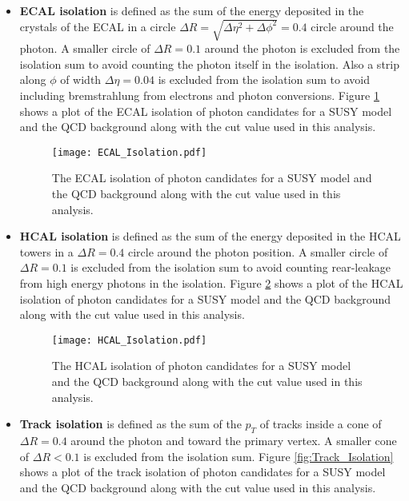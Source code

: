 \begin{itemize}
\item {\bf ECAL isolation} is defined as the sum of the energy deposited in the
crystals of the ECAL in a circle $\Delta R = \sqrt{\Delta\eta^{2} + 
\Delta\phi^{2}} = 0.4$ circle around the photon. A smaller circle of $\Delta R = 
0.1$ around the photon is excluded from the isolation sum to avoid counting the 
photon itself in the isolation. Also a strip along $\phi$ of width $\Delta \eta 
= 0.04$ is excluded from the isolation sum to avoid including bremstrahlung from 
electrons and photon conversions. Figure \ref{fig:ECAL_Isolation} shows a plot 
of the ECAL isolation of photon candidates for a SUSY model and the QCD 
background along with the cut value used in this analysis.

\begin{figure}
\begin{center}
\texttt{[image: ECAL\_Isolation.pdf]}
\end{center}
\caption{The ECAL isolation of photon candidates for a SUSY model and the QCD 
background along with the cut value used in this analysis.}
\label{fig:ECAL_Isolation}
\end{figure}

\item {\bf HCAL isolation} is defined as the sum of the energy deposited in the 
HCAL towers in a $\Delta R = 0.4$ circle around the photon position. A smaller 
circle of $\Delta R = 0.1$ is excluded from the isolation sum to avoid counting 
rear-leakage from high energy photons in the isolation. Figure 
\ref{fig:HCAL_Isolation} shows a plot of the HCAL isolation of photon candidates 
for a SUSY model and the QCD background along with the cut value used in this 
analysis.

\begin{figure}
\begin{center}
\texttt{[image: HCAL\_Isolation.pdf]}
\end{center}
\caption{The HCAL isolation of photon candidates for a SUSY model and the QCD 
background along with the cut value used in this analysis.}
\label{fig:HCAL_Isolation}
\end{figure}

\item {\bf Track isolation} is defined as the sum of the $p_{T}$ of tracks 
inside a cone of $\Delta R = 0.4$ around the photon and toward the primary 
vertex. A smaller cone of $\Delta R < 0.1$ is excluded from the isolation 
sum. Figure \ref{fig:Track_Isolation} shows a plot of the track isolation of
photon candidates for a SUSY model and the QCD background along with the cut 
value used in this analysis.


\end{itemize}
